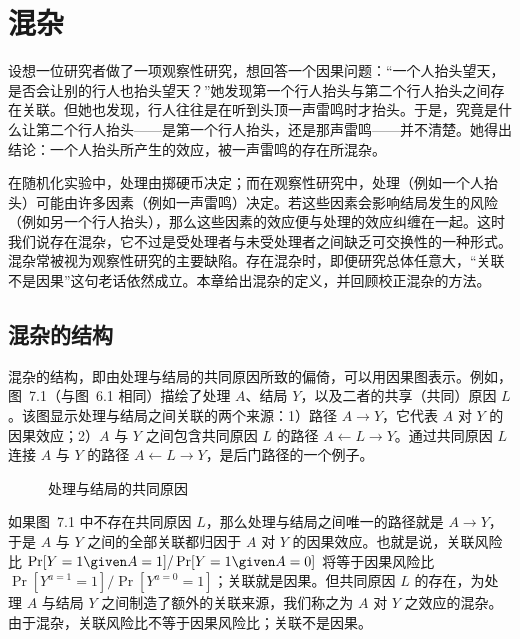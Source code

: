\chapter{混杂}

设想一位研究者做了一项观察性研究，想回答一个因果问题：“一个人抬头望天，是否会让别的行人也抬头望天？”她发现第一个行人抬头与第二个行人抬头之间存在关联。但她也发现，行人往往是在听到头顶一声雷鸣时才抬头。于是，究竟是什么让第二个行人抬头——是第一个行人抬头，还是那声雷鸣——并不清楚。她得出结论：一个人抬头所产生的效应，被一声雷鸣的存在所混杂。

在随机化实验中，处理由掷硬币决定；而在观察性研究中，处理（例如一个人抬头）可能由许多因素（例如一声雷鸣）决定。若这些因素会影响结局发生的风险（例如另一个行人抬头），那么这些因素的效应便与处理的效应纠缠在一起。这时我们说存在混杂，它不过是受处理者与未受处理者之间缺乏可交换性的一种形式。混杂常被视为观察性研究的主要缺陷。存在混杂时，即便研究总体任意大，“关联不是因果”这句老话依然成立。本章给出混杂的定义，并回顾校正混杂的方法。

\section{混杂的结构}

混杂的结构，即由处理与结局的共同原因所致的偏倚，可以用因果图表示。例如，图~7.1（与图~6.1 相同）描绘了处理 $A$、结局 $Y$，以及二者的共享（共同）原因 $L$。该图显示处理与结局之间关联的两个来源：1）路径 $A\to Y$，它代表 $A$ 对 $Y$ 的因果效应；2）$A$ 与 $Y$ 之间包含共同原因 $L$ 的路径 $A\leftarrow L\to Y$。通过共同原因 $L$ 连接 $A$ 与 $Y$ 的路径 $A\leftarrow L\to Y$，是后门路径的一个例子。

\begin{figure}[htbp]
\centering
{}
\caption{处理与结局的共同原因}
\label{fig:7.1}
\end{figure}

如果图~7.1 中不存在共同原因 $L$，那么处理与结局之间唯一的路径就是 $A\to Y$，于是 $A$ 与 $Y$ 之间的全部关联都归因于 $A$ 对 $Y$ 的因果效应。也就是说，关联风险比 $\Pr[Y=1\given A=1]/\Pr[Y=1\given A=0]$ 将等于因果风险比 $\Pr[Y^{a=1}=1]/\Pr[Y^{a=0}=1]$；关联就是因果。但共同原因 $L$ 的存在，为处理 $A$ 与结局 $Y$ 之间制造了额外的关联来源，我们称之为 $A$ 对 $Y$ 之效应的混杂。由于混杂，关联风险比不等于因果风险比；关联不是因果。

